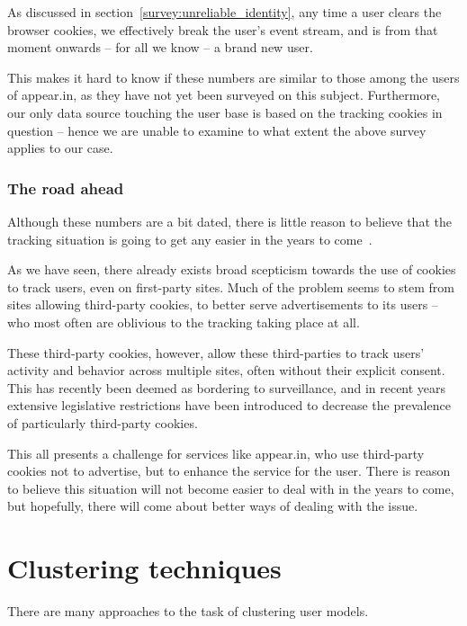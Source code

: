 As discussed in section~\ref{survey:unreliable_identity}, any time a user clears the browser cookies, we effectively break the user's event stream, and is from that moment onwards -- for all we know -- a brand new user.

This makes it hard to know if these numbers are similar to those among the users of appear.in, as they have not yet been surveyed on this subject. Furthermore, our only data source touching the user base is based on the tracking cookies in question -- hence we are unable to examine to what extent the above survey applies to our case.

\subsubsection{The road ahead}

Although these numbers are a bit dated, there is little reason to believe that the tracking situation is going to get any easier in the years to come~\cite{RuizMartinez2012,Nikiforakis2013,Sorensen2013,Eijk2011}.

As we have seen, there already exists broad scepticism towards the use of cookies to track users, even on first-party sites. Much of the problem seems to stem from sites allowing third-party cookies, to better serve advertisements to its users -- who most often are oblivious to the tracking taking place at all.

These third-party cookies, however, allow these third-parties to track users' activity and behavior across multiple sites, often without their explicit consent. This has recently been deemed as bordering to surveillance, and in recent years extensive legislative restrictions have been introduced to decrease the prevalence of particularly third-party cookies.

This all presents a challenge for services like appear.in, who use third-party cookies not to advertise, but to enhance the service for the user. There is reason to believe this situation will not become easier to deal with in the years to come, but hopefully, there will come about better ways of dealing with the issue.

\section{Clustering techniques}
\label{survey:sec:clustering_techniques}

There are many approaches to the task of clustering user models.

